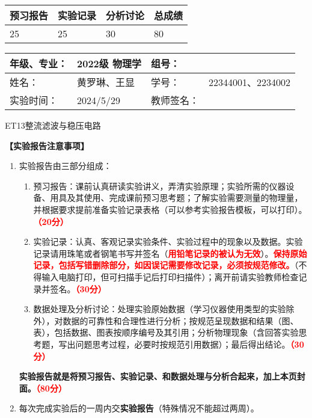 \documentclass[dvipsnames, svgnames,a4paper,11pt]{article}
\begin{document}
	
	\begin{table}
		\renewcommand\arraystretch{1.7}
		\begin{tabularx}{\textwidth}{
				|X|X|X|X
				|X|X|X|X|}
			\hline
			\multicolumn{2}{|c|}{预习报告}&\multicolumn{2}{|c|}{实验记录}&\multicolumn{2}{|c|}{分析讨论}&\multicolumn{2}{|c|}{总成绩}\\
			\hline
			\LARGE25 & & \LARGE25 & & \LARGE30 & & \LARGE80 & \\
			\hline
		\end{tabularx}
	\end{table}
	
	\begin{table}
		\renewcommand\arraystretch{1.7}
		\begin{tabularx}{\textwidth}{|X|X|X|X|}
			\hline
			年级、专业： & 2022级 物理学 &组号： & \\
			\hline
			姓名： & 黄罗琳、王显   & 学号： &22344001、2234002   \\
			\hline
			实验时间： & 2024/5/29 & 教师签名： & \\
			\hline
		\end{tabularx}
	\end{table}
	
	\begin{center}
		\LARGE ET13\quad 整流滤波与稳压电路
	\end{center}
	
	
	\textbf{【实验报告注意事项】}
	\begin{enumerate}
		\item 实验报告由三部分组成：
		\begin{enumerate}
			\item 预习报告：课前认真研读实验讲义，弄清实验原理；实验所需的仪器设备、用具及其使用、完成课前预习思考题；了解实验需要测量的物理量，并根据要求提前准备实验记录表格（可以参考实验报告模板，可以打印）。\textcolor{red}{\textbf{（20分）}}
			\item 实验记录：认真、客观记录实验条件、实验过程中的现象以及数据。实验记录请用珠笔或者钢笔书写并签名（\textcolor{red}{\textbf{用铅笔记录的被认为无效}}）。\textcolor{red}{\textbf{保持原始记录，包括写错删除部分，如因误记需要修改记录，必须按规范修改。}}（不得输入电脑打印，但可扫描手记后打印扫描件）；离开前请实验教师检查记录并签名。\textcolor{red}{\textbf{（30分）}}
			\item 数据处理及分析讨论：处理实验原始数据（学习仪器使用类型的实验除外），对数据的可靠性和合理性进行分析；按规范呈现数据和结果（图、表），包括数据、图表按顺序编号及其引用；分析物理现象（含回答实验思考题，写出问题思考过程，必要时按规范引用数据）；最后得出结论。\textcolor{red}{\textbf{（30分）}}
		\end{enumerate}
		\textbf{实验报告就是将预习报告、实验记录、和数据处理与分析合起来，加上本页封面。\textcolor{red}{（80分）}}
		\item 每次完成实验后的一周内交\textbf{实验报告}（特殊情况不能超过两周）。
		
	\end{enumerate}
	
\end{document}
